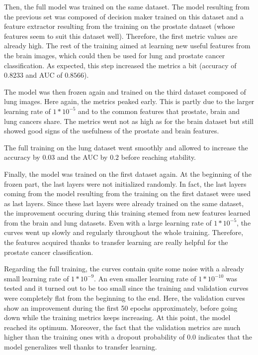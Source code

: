 Then, the full model was trained on the same dataset. The model resulting from the previous set was composed of decision maker trained on this dataset and a feature extractor resulting from the training on the prostate dataset (whose features seem to suit this dataset well). Therefore, the first metric values are already high. The rest of the training aimed at learning new useful features from the brain images, which could then be used for lung and prostate cancer classification. As expected, this step increased the metrics a bit (accuracy of $0.8233$ and AUC of $0.8566$).

The model was then frozen again and trained on the third dataset composed of lung images. Here again, the metrics peaked early. This is partly due to the larger learning rate of $1*10^{-5}$ and to the common features that prostate, brain and lung cancers share. The metrics went not as high as for the brain dataset but still showed good signs of the usefulness of the prostate and brain features.

The full training on the lung dataset went smoothly and allowed to increase the accuracy by $0.03$ and the AUC by $0.2$ before reaching stability.

Finally, the model was trained on the first dataset again. At the beginning of the frozen part, the last layers were not initialized randomly. In fact, the last layers coming from the model resulting from the training on the first dataset were used as last layers. Since these last layers were already trained on the same dataset, the improvement occuring during this training stemed from new features learned from the brain and lung datasets. Even with a large learning rate of $1*10^{-5}$, the curves went up slowly and regularly throughout the whole training. Therefore, the features acquired thanks to transfer learning are really helpful for the prostate cancer classification.

Regarding the full training, the curves contain quite some noise with a already small learning rate of $1*10^{-9}$. An even smaller learning rate of $1*10^{-10}$ was tested and it turned out to be too small since the training and validation curves were completely flat from the beginning to the end. Here, the validation curves show an improvement during the first 50 epochs approximately, before going down while the training metrics keeps increasing. At this point, the model reached its optimum. Moreover, the fact that the validation metrics are much higher than the training ones with a dropout probability of 0.0 indicates that the model generalizes well thanks to transfer learning. 


